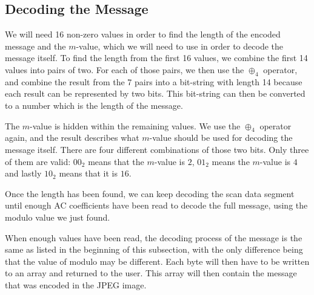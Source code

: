 \subsection{Decoding the Message}
We will need 16 non-zero values in order to find the length of the encoded message and the $m$-value, which we will need to use in order to decode the message itself.
To find the length from the first 16 values, we combine the first 14 values into pairs of two.
For each of those pairs, we then use the $\oplus_4$ operator, and combine the result from the 7 pairs into a bit-string with length 14 because each result can be represented by two bits. This bit-string can then be converted to a number which is the length of the message.

The $m$-value is hidden within the remaining values. We use the $\oplus_4$ operator again, and the result describes what $m$-value should be used for decoding the message itself.
There are four different combinations of those two bits.
Only three of them are valid: $00_2$ means that the $m$-value is $2$, $01_2$ means the $m$-value is $4$ and lastly $10_2$ means that it is $16$.

Once the length has been found, we can keep decoding the scan data segment until enough AC coefficients have been read to decode the full message, using the modulo value we just found.

When enough values have been read, the decoding process of the message is the same as listed in the beginning of this subsection, with the only difference being that the value of modulo may be different. 
Each byte will then have to be written to an array and returned to the user.
This array will then contain the message that was encoded in the JPEG image.